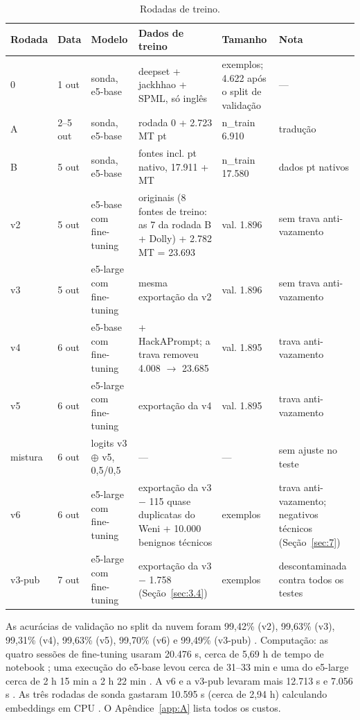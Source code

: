 \documentclass[11pt]{article}
\begin{document}
\begin{table}[tbp]
\centering
\small
\caption{Rodadas de treino.}\label{tab:3}
\begin{tabularx}{\linewidth}{@{}ll>{\raggedright\arraybackslash\hsize=0.88\hsize}X>{\raggedright\arraybackslash\hsize=1.58\hsize}X>{\raggedright\arraybackslash\hsize=0.62\hsize}X>{\raggedright\arraybackslash\hsize=0.93\hsize}X@{}}
\toprule
Rodada & Data & Modelo & Dados de treino & Tamanho & Nota \\
\midrule
0 & 1 out & sonda, e5-base & deepset + jackhhao + SPML, só inglês & 5.590 exemplos; 4.622 após o split de validação %
 & — \\
A & 2–5 out & sonda, e5-base & rodada 0 + 2.723 MT pt %
 & n\_train 6.910 %
 & tradução \\
B & 5 out & sonda, e5-base & 7 fontes incl. pt nativo, 17.911 + MT %
 & n\_train 17.580 %
 & dados pt nativos \\
v2 & 5 out & e5-base com fine-tuning & 20.911 originais (8 fontes de treino: as 7 da rodada B + Dolly) + 2.782 MT = 23.693 %
 & val. 1.896 %
 & sem trava anti-vazamento %
 \\
v3 & 5 out & e5-large com fine-tuning & mesma exportação da v2 %
 & val. 1.896 %
 & sem trava anti-vazamento \\
v4 & 6 out & e5-base com fine-tuning & + HackAPrompt; a trava removeu 4.008 \ensuremath{\rightarrow} 23.685 %
 & val. 1.895 %
 & trava anti-vazamento \\
v5 & 6 out & e5-large com fine-tuning & exportação da v4 %
 & val. 1.895 %
 & trava anti-vazamento \\
mistura & 6 out & logits v3 \ensuremath{\oplus} v5, 0,5/0,5 %
 & — & — & sem ajuste no teste \\
v6 & 6 out & e5-large com fine-tuning & exportação da v3 \ensuremath{-} 115 quase duplicatas do Weni + 10.000 benignos técnicos %
 & 33.578 exemplos & trava anti-vazamento; negativos técnicos (Seção~\ref{sec:7}) \\
v3-pub & 7 out & e5-large com fine-tuning & exportação da v3 \ensuremath{-} 1.758 (Seção~\ref{sec:3.4}) %
 & 21.935 exemplos & descontaminada contra todos os testes \\
\bottomrule
\end{tabularx}
\end{table}

As acurácias de validação no split da nuvem foram 99,42\% (v2), 99,63\% (v3), 99,31\% (v4), 99,63\% (v5), 99,70\% (v6) e 99,49\% (v3-pub)%
. Computação: as quatro sessões de fine-tuning usaram 20.476 s, cerca de 5,69 h de tempo de notebook%
; uma execução do e5-base levou cerca de 31–33 min e uma do e5-large cerca de 2 h 15 min a 2 h 22 min%
. A v6 e a v3-pub levaram mais 12.713 s e 7.056 s%
. As três rodadas de sonda gastaram 10.595 s (cerca de 2,94 h) calculando embeddings em CPU%
. O Apêndice~\ref{app:A} lista todos os custos.
\end{document}
